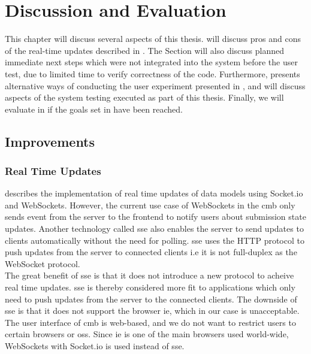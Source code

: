 \chapter{Discussion and Evaluation}
\label{ch:evaluation}
This chapter will discuss several aspects of this thesis.  will discuss pros and cons of the real-time updates described in . The Section will also discuss planned immediate next steps which were not integrated into the system before the user test, due to limited time to verify correctness of the code. Furthermore,  presents alternative ways of conducting the user experiment presented in , and  will discuss aspects of the system testing executed as part of this thesis. Finally, we will evaluate in  if the goals set in  have been reached.

\section{Improvements}
\label{sec:eval-tech}

\subsection{Real Time Updates}
 describes the implementation of real time updates of data models using Socket.io and WebSockets. However, the current use case of WebSockets in the \gls{cmb} only sends event from the server to the frontend to notify users about submission state updates. Another technology called \gls{sse} \cite{hickson2009} also enables the server to send updates to clients automatically without the need for polling. \gls{sse} uses the HTTP protocol to push updates from the server to connected clients i.e it is not full-duplex as the WebSocket protocol.  \\

The great benefit of \gls{sse} is that it does not introduce a new protocol to acheive real time updates. \gls{sse} is thereby considered more fit to applications which only need to push updates from the server to the connected clients. The downside of \gls{sse} is that it does not support the browser \gls{ie}, which in our case is unacceptable. The user interface of \gls{cmb} is web-based, and we do not want to restrict users to certain browsers or \glspl{os}. Since \gls{ie} is one of the main browsers used world-wide, WebSockets with Socket.io is used instead of \gls{sse}.  \\

